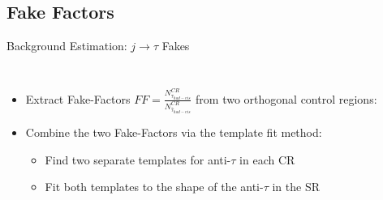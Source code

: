 \documentclass[aspectratio=169,xcolor=table]{beamer}
\begin{document}
  \subsection{ Fake Factors }

    \begin{frame}[t]{Background Estimation: $j \rightarrow \tau$ Fakes}
      \begin{columns}[t]
        \vspace{-3.5cm}
        \begin{itemize}
          \item Extract Fake-Factors $FF = \frac{N^{CR}_{\tau_{had-vis}}}{N^{CR}_{\bar{\tau}_{had-vis}}}$ from two orthogonal control regions:
            \begin{table}
              \tiny
            \end{table}
          \item Combine the two Fake-Factors via the template fit method:
          \begin{itemize}
            \item Find two separate templates for anti-$\tau$ in each CR
            \item Fit both templates to the shape of the anti-$\tau$ in the SR

\end{itemize}
\end{itemize}
\end{columns}
\end{frame}
\end{document}
